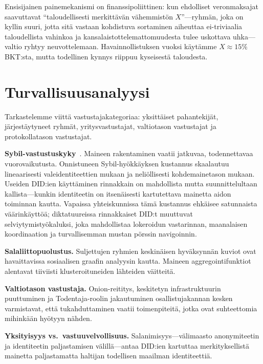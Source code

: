 \documentclass[11pt,a4paper,twocolumn]{article}
\begin{document}
Ensisijainen painemekanismi on finanssipoliittinen: kun ehdolliset veronmaksajat saavuttavat ``taloudellisesti merkittävän vähemmistön $X$''---ryhmän, joka on kyllin suuri, jotta sitä vastaan kohdistuva sortaminen aiheuttaa ei-triviaalia taloudellista vahinkoa ja kansalaistottelemattomuudesta tulee uskottava uhka---valtio ryhtyy neuvottelemaan. Havainnollistuksen vuoksi käytämme $X \approx 15\%$ BKT:sta, mutta todellinen kynnys riippuu kyseisestä taloudesta.

\section{Turvallisuusanalyysi}

Tarkastelemme viittä vastustajakategoriaa: yksittäiset pahantekijät, järjestäytyneet ryhmät, yritysvastustajat, valtiotason vastustajat ja protokollatason vastustajat.

\textbf{Sybil-vastustuskyky}~\cite{douceur2002}. Maineen rakentaminen vaatii jatkuvaa, todennettavaa vuorovaikutusta. Onnistuneen Sybil-hyökkäyksen kustannus skaalautuu lineaarisesti valeidentiteettien mukaan ja neliöllisesti kohdemainetason mukaan. Useiden DID:ien käyttäminen rinnakkain on mahdollista mutta suunnittelultaan kallista---kunkin identiteetin on itsenäisesti kartutettava mainetta aidon toiminnan kautta. Vapaissa yhteiskunnissa tämä kustannus ehkäisee satunnaista väärinkäyttöä; diktatuureissa rinnakkaiset DID:t muuttuvat selviytymistyökaluksi, joka mahdollistaa lokeroidun vastarinnan, maanalaisen koordinaation ja turvallisemman mustan pörssin navigoinnin.

\textbf{Salaliittopuolustus.} Suljettujen ryhmien keskinäisen hyväksynnän kuviot ovat havaittavissa sosiaalisen graafin analyysin kautta. Maineen aggregointifunktiot alentavat tiiviisti klusteroituneiden lähteiden väitteitä.

\textbf{Valtiotason vastustaja.} Onion-reititys, keskitetyn infrastruktuurin puuttuminen ja Todentaja-roolin jakautuminen osallistujakannan kesken varmistavat, että tukahduttaminen vaatii toimenpiteitä, jotka ovat suhteettomia mihinkään hyötyyn nähden.

\textbf{Yksityisyys vs.\ vastuuvelvollisuus.} Salanimisyys---välimaasto anonymiteetin ja identiteetin paljastamisen välillä---antaa DID:ien kartuttaa merkityksellistä mainetta paljastamatta haltijan todellisen maailman identiteettiä.
\end{document}
